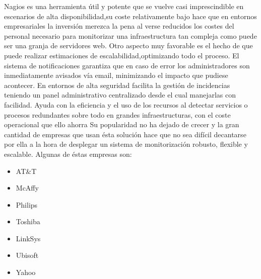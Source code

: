 \documentclass[paper=a4, fontsize=12pt]{scrartcl} %
\begin{document}
Nagios es una herramienta útil y potente que se vuelve casi imprescindible en escenarios de alta disponibilidad,su coste relativamente bajo hace que en entornos empresariales la inversión merezca la pena al verse reducidos los costes del personal necesario para monitorizar una infraestructura tan compleja como puede ser una granja de servidores web. Otro aspecto muy favorable es el hecho de que puede realizar estimaciones de escalabilidad,optimizando todo el proceso. El sistema de notificaciones garantiza que en caso de error los administradores son inmediatamente avisados vía email, minimizando el impacto que pudiese acontecer.
En entornos de alta seguridad facilita la gestión de incidencias teniendo un panel administrativo centralizado \cite{p11} desde el cual manejarlas con facilidad. Ayuda con la eficiencia y el uso de los recursos al detectar servicios o procesos redundantes sobre todo en grandes infraestructuras, con el coste operacional que ello ahorra \cite{p12}
Su popularidad no ha dejado de crecer \cite{p5} y la gran cantidad de empresas que usan ésta solución hace que no sea difícil decantarse por ella a la hora de desplegar un sistema de monitorización robusto, flexible y escalable. Algunas de éstas empresas son: \cite{p13}
\begin{itemize}
	\item AT\&T
	\item McAffy
	\item Philips
	\item Toshiba
	\item LinkSys
	\item Ubisoft
	\item Yahoo
\end{itemize}


\end{document}
